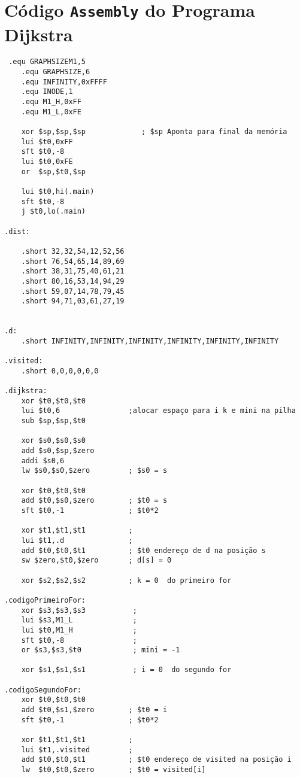 \section{Código \texttt{Assembly} do Programa Dijkstra}
\scriptsize
\begin{verbatim}
 .equ GRAPHSIZEM1,5 
    .equ GRAPHSIZE,6
    .equ INFINITY,0xFFFF
    .equ INODE,1
    .equ M1_H,0xFF
    .equ M1_L,0xFE  

    xor $sp,$sp,$sp             ; $sp Aponta para final da memória   
    lui $t0,0xFF
    sft $t0,-8
    lui $t0,0xFE
    or  $sp,$t0,$sp
         
    lui $t0,hi(.main)
    sft $t0,-8
    j $t0,lo(.main)  

.dist:

    .short 32,32,54,12,52,56
    .short 76,54,65,14,89,69
    .short 38,31,75,40,61,21
    .short 80,16,53,14,94,29 
    .short 59,07,14,78,79,45
    .short 94,71,03,61,27,19


.d: 
    .short INFINITY,INFINITY,INFINITY,INFINITY,INFINITY,INFINITY

.visited:
    .short 0,0,0,0,0,0

.dijkstra:
    xor $t0,$t0,$t0 
    lui $t0,6                ;alocar espaço para i k e mini na pilha      
    sub $sp,$sp,$t0          
    
    xor $s0,$s0,$s0                            
    add $s0,$sp,$zero
    addi $s0,6  
    lw $s0,$s0,$zero         ; $s0 = s
    
    xor $t0,$t0,$t0 
    add $t0,$s0,$zero        ; $t0 = s   
    sft $t0,-1               ; $t0*2  
    
    xor $t1,$t1,$t1          ;
    lui $t1,.d               ; 
    add $t0,$t0,$t1          ; $t0 endereço de d na posição s
    sw $zero,$t0,$zero       ; d[s] = 0

    xor $s2,$s2,$s2          ; k = 0  do primeiro for

.codigoPrimeiroFor:
    xor $s3,$s3,$s3           ;
    lui $s3,M1_L              ;
    lui $t0,M1_H              ;
    sft $t0,-8                ; 
    or $s3,$s3,$t0            ; mini = -1

    xor $s1,$s1,$s1           ; i = 0  do segundo for
 
.codigoSegundoFor:
    xor $t0,$t0,$t0
    add $t0,$s1,$zero        ; $t0 = i   
    sft $t0,-1               ; $t0*2  
    
    xor $t1,$t1,$t1          ;
    lui $t1,.visited         ; 
    add $t0,$t0,$t1          ; $t0 endereço de visited na posição i
    lw  $t0,$t0,$zero        ; $t0 = visited[i]
    

\end{verbatim}
